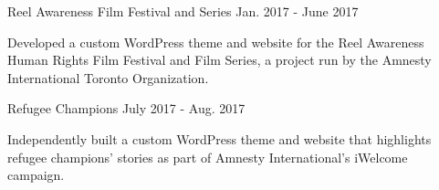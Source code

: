 

\begin{cventries}

  \cventry
    {Reel Awareness Film Festival and Series} %
    {} %
    {} %
    {Jan. 2017 - June 2017} %
    {
      \begin{cvitems} %
        \item {Developed a custom WordPress theme and website for the Reel Awareness Human Rights Film Festival and Film Series, a project run by the Amnesty International Toronto Organization.}
      \end{cvitems}
    }

  \cventry
    {Refugee Champions} %
    {} %
    {} %
    {July 2017 - Aug. 2017} %
    {
      \begin{cvitems} %
        \item {Independently built a custom WordPress theme and website that highlights refugee champions’ stories as part of Amnesty International’s iWelcome campaign.}
      \end{cvitems}
    }
\end{cventries}
